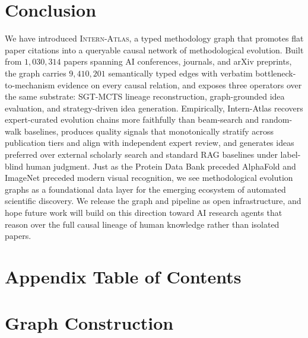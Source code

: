 \documentclass{llmxive}
\begin{document}
\section{Conclusion}
We have introduced \textsc{Intern-Atlas}, a typed methodology graph that promotes flat paper citations into a queryable causal network of methodological evolution. Built from $1{,}030{,}314$ papers spanning AI conferences, journals, and arXiv preprints, the graph carries $9{,}410{,}201$ semantically typed edges with verbatim bottleneck-to-mechanism evidence on every causal relation, and exposes three operators over the same substrate: SGT-MCTS lineage reconstruction, graph-grounded idea evaluation, and strategy-driven idea generation. Empirically, Intern-Atlas recovers expert-curated evolution chains more faithfully than beam-search and random-walk baselines, produces quality signals that monotonically stratify across publication tiers and align with independent expert review, and generates ideas preferred over external scholarly search and standard RAG baselines under label-blind human judgment. Just as the Protein Data Bank preceded AlphaFold and ImageNet preceded modern visual recognition, we see methodological evolution graphs as a foundational data layer for the emerging ecosystem of automated scientific discovery. We release the graph and pipeline as open infrastructure, and hope future work will build on this direction toward AI research agents that reason over the full causal lineage of human knowledge rather than isolated papers.






\appendix

\section*{Appendix Table of Contents}
\begingroup
\hypersetup{linkcolor=black}
\startcontents[appendix]
\endgroup

\vspace{1em}

\section{Graph Construction}
\label{app:graph}
\end{document}
